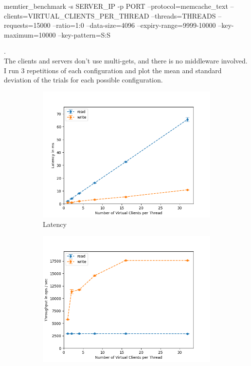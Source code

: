 \documentclass[11pt,a4paper]{article}
\begin{document}
\begin{spverbatim}
      memtier_benchmark -s {SERVER_IP} -p {PORT}
      --protocol=memcache_text --clients={VIRTUAL_CLIENTS_PER_THREAD} --threads={THREADS}
      --requests=15000 --ratio=1:0 --data-size=4096
     --expiry-range=9999-10000 --key-maximum=10000 --key-pattern=S:S
\end{spverbatim}
.\\
The clients and servers don't use multi-gets, and there is no middleware involved.
I run 3 repetitions of each configuration and plot the mean and standard deviation of the trials for each possible configuration. \\

\begin{figure}[H]
\centering
\begin{subfigure}{.5\textwidth}
    \centering
    \includegraphics[width=\textwidth]{img/exp2_1/exp2_1__latency_client_read_write.png}
    \caption{Latency}
    \label{fig:mesh1}
\end{subfigure}%
\begin{subfigure}{.5\textwidth}
      \centering
    \includegraphics[width=\textwidth]{img/exp2_1/exp2_1__throughput_client_read_write.png}

\end{subfigure}
\end{figure}
\end{document}
